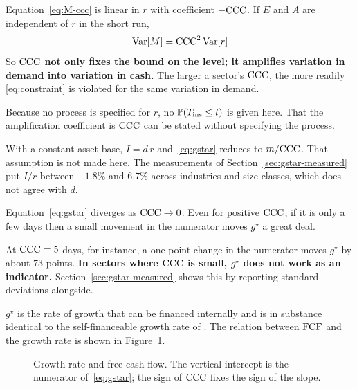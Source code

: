 \begin{remark}
\label{rem:ccc-amplifier}
Equation~\eqref{eq:M-ccc} is linear in $r$ with coefficient $-\mathrm{CCC}$. If $E$ and $A$ are
independent of $r$ in the short run,
\[
\operatorname{Var}[M] = \mathrm{CCC}^{2}\operatorname{Var}[r]
\]
So \textbf{$\mathrm{CCC}$ not only fixes the bound on the level; it amplifies variation in demand
into variation in cash.} The larger a sector's $\mathrm{CCC}$, the more readily
\eqref{eq:constraint} is violated for the same variation in demand.

Because no process is specified for $r$, no $\mathbb{P}(T_{\mathrm{ins}}\leq t)$ is given here. That the
amplification coefficient is $\mathrm{CCC}$ can be stated without specifying the process.
\end{remark}

\begin{remark}
\label{rem:no-steady-investment}
With a constant asset base, $I = d\,r$ and~\eqref{eq:gstar} reduces to $m/\mathrm{CCC}$. That
assumption is not made here. The measurements of Section~\ref{sec:gstar-measured} put $I/r$
between $-1.8\%$ and $6.7\%$ across industries and size classes, which does not agree
with $d$.
\end{remark}

\begin{remark}
\label{rem:gstar-divergence}
Equation~\eqref{eq:gstar} diverges as $\mathrm{CCC}\to 0$. Even for positive $\mathrm{CCC}$, if it is only a
few days then a small movement in the numerator moves $g^\star$ a great deal.

At $\mathrm{CCC}=5$ days, for instance, a one-point change in the numerator moves $g^\star$ by about
73 points.
\textbf{In sectors where $\mathrm{CCC}$ is small, $g^\star$ does not work as an indicator.}
Section~\ref{sec:gstar-measured} shows this by reporting standard deviations alongside.
\end{remark}

$g^\star$ is the rate of growth that can be financed internally and is in substance
identical to the self-financeable growth rate of \cite{churchill2001}.
The relation between $\mathrm{FCF}$ and the growth rate is shown in Figure~\ref{fig:growth}.

\begin{figure}[htbp]
\centering
{}
\caption{Growth rate and free cash flow. The vertical intercept is the numerator of~\eqref{eq:gstar}; the sign of $\mathrm{CCC}$ fixes the sign of the slope.}
\label{fig:growth}
\end{figure}

